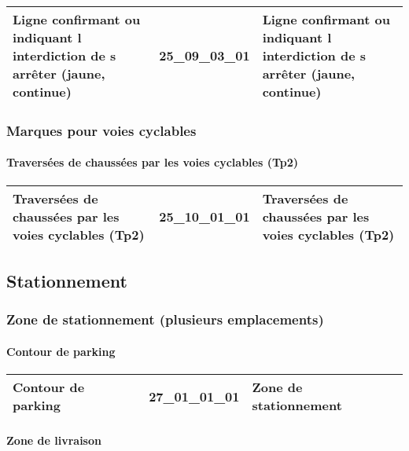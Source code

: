 \documentclass[12pt,titlepage]{book}
\begin{document}
\renewcommand{\arraystretch}{1.2}
\begin{supertabular}{|p{10cm}|c|p{15cm}|}
 Ligne confirmant ou indiquant l interdiction de s arrêter (jaune, continue) & 25\_09\_03\_01 & Ligne confirmant ou indiquant l interdiction de s arrêter (jaune, continue)\\
\hline
\end{supertabular}

\subsubsection{\large Marques pour voies cyclables}
\paragraph{Traversées de chaussées par les voies cyclables (Tp2)}
\noindent
\vspace{\baselineskip}

\renewcommand{\arraystretch}{1.2}
\begin{supertabular}{|p{10cm}|c|p{15cm}|}
 Traversées de chaussées par les voies cyclables (Tp2) & 25\_10\_01\_01 & Traversées de chaussées par les voies cyclables (Tp2)\\
\hline
\end{supertabular}
\subsection{Stationnement}
\subsubsection{\large Zone de stationnement (plusieurs emplacements)}
\paragraph{Contour de parking}
\noindent
\vspace{\baselineskip}

\renewcommand{\arraystretch}{1.2}
\begin{supertabular}{|p{10cm}|c|p{15cm}|}
 Contour de parking & 27\_01\_01\_01 & Zone de stationnement\\
\hline
\end{supertabular}


\paragraph{Zone de livraison}
\noindent
\vspace{\baselineskip}
\end{document}

